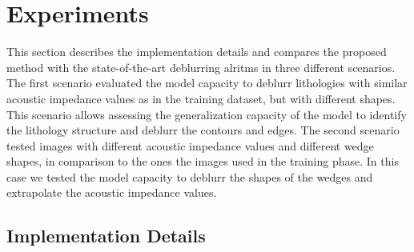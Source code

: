 \documentclass[conference,compsoc]{IEEEtran}
\begin{document}
\section{Experiments}
This section describes the implementation details and compares the proposed method  with the state-of-the-art
deblurring alritms in three different scenarios. The first scenario
evaluated the model capacity to deblurr lithologies with similar acoustic impedance
values as in the training dataset, but with different shapes.
This scenario allows assessing the generalization capacity of the model
to identify the lithology structure and deblurr the contours and edges.
The second scenario tested images with different acoustic impedance values and
different wedge shapes, in comparison to the ones the images used in the training phase.
In this case we tested the model capacity to deblurr the shapes of the wedges and
extrapolate the acoustic impedance values.

\subsection{Implementation Details}

%
%

\end{document}
